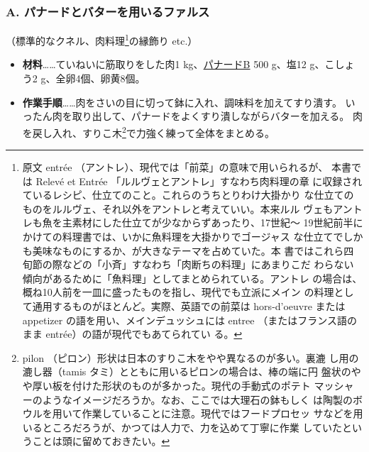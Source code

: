 \vspace*{1\zw}
\begin{recette}
\hypertarget{farce-a}{%
\subsubsection{A. パナードとバターを用いるファルス}\label{farce-a}}



（標準的なクネル、肉料理\footnote{原文 entrée
  （アントレ）、現代では「前菜」の意味で用いられるが、 本書では Relevé
  et Entrée 「ルルヴェとアントレ」すなわち肉料理の章
  に収録されているレシピ、仕立てのこと。これらのうちとりわけ大掛かり
  な仕立てのものをルルヴェ、それ以外をアントレと考えていい。本来ルル
  ヴェもアントレも魚を主素材にした仕立てが少なからずあったり、17世紀〜
  19世紀前半にかけての料理書では、いかに魚料理を大掛かりでゴージャス
  な仕立てでしかも美味なものにするか、が大きなテーマを占めていた。本
  書ではこれら四旬節の際などの「小斉」すなわち「肉断ちの料理」にあまりこだ
  わらない傾向があるために「魚料理」としてまとめられている。アントレ
  の場合は、概ね10人前を一皿に盛ったものを指し、現代でも立派にメイン
  の料理として通用するものがほとんど。実際、英語での前菜は hors-d'oeuvre
  または appetizer の語を用い、メインデュッシュには entree
  （またはフランス語のまま entrée）の語が現代でもあてられてい る。}の縁飾り
etc.）

\begin{itemize}
\item
  \textbf{材料}\ldots{}\ldots{}ていねいに筋取りをした肉1
  kg、\protect\hyperlink{panade-b}{パナードB} 500 g、塩12 g、こしょう2
  g、全卵4個、卵黄8個。
\item
  \textbf{作業手順}\ldots{}\ldots{}肉をさいの目に切って鉢に入れ、調味料を加えてすり潰す。
  いったん肉を取り出して、パナードをよくすり潰しながらバターを加える。
  肉を戻し入れ、すりこ木\footnote{pilon
    （ピロン）形状は日本のすりこ木をやや異なるのが多い。裏漉
    し用の漉し器（tamis タミ）とともに用いるピロンの場合は、棒の端に円
    盤状のやや厚い板を付けた形状のものが多かった。現代の手動式のポテト
    マッシャーのようなイメージだろうか。なお、ここでは大理石の鉢もしく
    は陶製のボウルを用いて作業していることに注意。現代ではフードプロセッ
    サなどを用いるところだろうが、かつては人力で、力を込めて丁寧に作業
    していたということは頭に留めておきたい。}で力強く練って全体をまとめる。
\end{itemize}


\end{recette}
